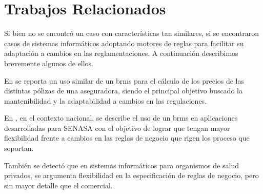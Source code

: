 \section{Trabajos Relacionados}

Si bien no se encontró un caso con características tan similares, si se encontraron casos de sistemas informáticos adoptando motores de reglas para facilitar su adaptación a cambios en las reglamentaciones. 
A continuación describimos brevemente algunos de ellos.

En \cite{medic2019calculation} se reporta un uso similar de un \acrshort{brms} \cite{proctor2012drools} para el cálculo de los precios de las distintas pólizas de una aseguradora, siendo el principal objetivo buscado la mantenibilidad y la adaptabilidad a cambios en las regulaciones.

En \cite{sampol2019sistema}, en el contexto nacional, se describe el uso de un \acrshort{brms} en aplicaciones desarrolladas para SENASA con el objetivo de lograr que tengan mayor flexibilidad frente a cambios en las reglas de negocio que rigen los proceso que soportan.

También se detectó que en sistemas informáticos para organismos de salud privados, se argumenta flexibilidad en la especificación de reglas de negocio, pero sin mayor detalle que el comercial.
